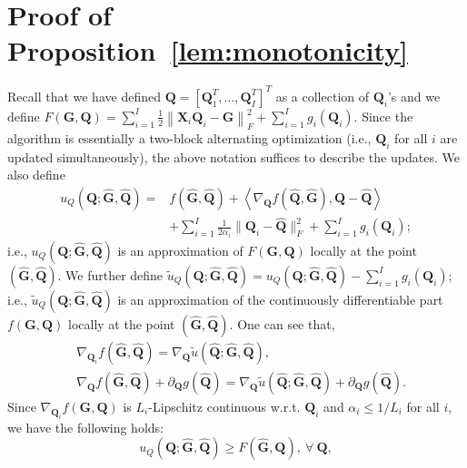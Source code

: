 \documentclass[10pt,journal]{IEEEtran}
\newcommand{\Q}{\boldsymbol{Q}}
\begin{document}
\section{Proof of Proposition~\ref{lem:monotonicity}}
Recall that we have defined ${\bm Q}=[{\bm Q}_1^T,\ldots,{\bm Q}_I^T]^T$ as a collection 
of $\Q_i$'s
and we define
$F({\bm G},{\bm Q}) = \sum_{i=1}^{I}\frac{1}{2}\left\|{\bm X}_i{\bm Q}_i-{\bm G}\right\|_F^2 + \sum_{i=1}^Ig_i(\Q_i)$.
Since the algorithm is essentially a two-block alternating optimization (i.e., ${\bm Q}_i$ for all $i$ are updated simultaneously), the above notation suffices to describe the updates.
We also define
\begin{align*}
u_Q\left(\Q;\hat{\bm G},\hat{\bm Q}\right) = &f(\hat{\bm G},\hat{\bm Q}) +  \left<\nabla_{{\bm Q}} f(\hat{\bm Q},\hat{\bm G}),{\bm Q}-\hat{\bm Q}\right>\\
&+ \sum_{i=1}^I\frac{1}{2\alpha_i}\|{\bm Q}_i-\hat{\bm Q}\|_F^2+ \sum_{i=1}^Ig_i(\Q_i);
\end{align*}
i.e., $u_Q\left({\bm Q};\hat{\bm G},\hat{\bm Q}\right)$ is an approximation of $F({\bm G},{\bm Q})$
locally at the point $(\hat{\bm G},\hat{\bm Q})$.
We further define
$\tilde{u}_Q\left(\Q;\hat{\bm G},\hat{\bm Q}\right) = u_Q\left({\bm Q};\hat{\bm G},\hat{\bm Q}\right) -\sum_{i=1}^Ig_i(\Q_i)$;
i.e., $\tilde{u}_Q\left(\Q;\hat{\bm G},\hat{\bm Q}\right)$ is an approximation of the continuously differentiable part $f({\bm G},{\bm Q})$
locally at the point $(\hat{\bm G},\hat{\bm Q})$.
One can see that,
\begin{subequations}\label{eq:gradequal}
\begin{align}
	&\nabla_{{\bm Q}_i} f\left(\hat{\bm G},\hat{\bm Q}\right)=\nabla_{{\bm Q}} \tilde{u}\left(\hat{\bm Q};\hat{\bm G},\hat{\bm Q}\right),\\
	& \nabla_{{\bm Q}} f\left(\hat{\bm G},\hat{\bm Q}\right) + \partial_{\Q} g(\hat{\Q}) = \nabla_{{\bm Q}}\tilde{u}\left(\hat{\bm Q};\hat{\bm G},\hat{\bm Q}\right) + \partial_{\Q} g(\hat{\Q}).
\end{align}
\end{subequations}
Since $\nabla_{{\bm Q}_i} f({\bm G},{\bm Q})$ is $L_i$-Lipschitz continuous w.r.t. ${\bm Q}_i$ and $\alpha_i\leq 1/L_i$ for all $i$, we have the following holds:
\begin{equation}\label{eq:gleqf}
	u_Q\left({\bm Q};\hat{\bm G},\hat{\bm Q}\right)\geq F\left(\hat{\bm G},{\bm Q}\right),~\forall~{\bm Q},
\end{equation}
\end{document}
